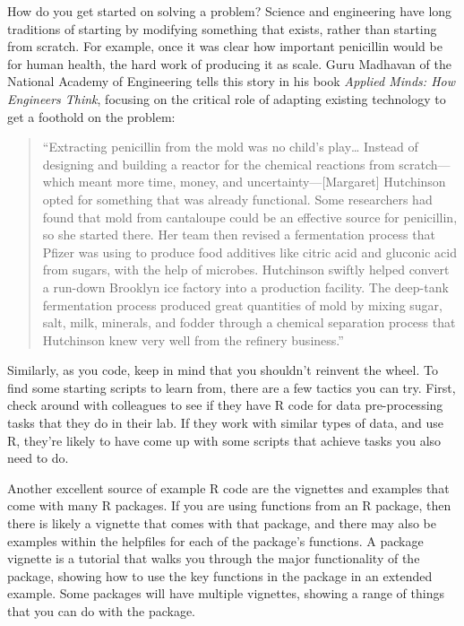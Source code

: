 \documentclass[]{tufte-book}
\begin{document}
How do you get started on solving a problem? Science and engineering have long
traditions of starting by modifying something that exists, rather than starting
from scratch. For example, once it was clear how important penicillin would be
for human health, the hard work of producing it as scale. Guru Madhavan of the
National Academy of Engineering tells this story in his book \emph{Applied Minds: How
Engineers Think}, focusing on the critical role of adapting existing technology
to get a foothold on the problem:

\begin{quote}
``Extracting penicillin from the mold was no child's play\ldots{} Instead of
designing and building a reactor for the chemical reactions from scratch---which
meant more time, money, and uncertainty---{[}Margaret{]} Hutchinson opted for
something that was already functional. Some researchers had found that mold from
cantaloupe could be an effective source for penicillin, so she started there.
Her team then revised a fermentation process that Pfizer was using to produce
food additives like citric acid and gluconic acid from sugars, with the help of
microbes. Hutchinson swiftly helped convert a run-down Brooklyn ice factory into
a production facility. The deep-tank fermentation process produced great
quantities of mold by mixing sugar, salt, milk, minerals, and fodder through a
chemical separation process that Hutchinson knew very well from the refinery
business.'' \citep{madhavan2015applied}
\end{quote}

Similarly, as you code, keep in mind that you shouldn't reinvent the wheel. To
find some starting scripts to learn from, there are a few tactics you can try.
First, check around with colleagues to see if they have R code for data
pre-processing tasks that they do in their lab. If they work with similar types
of data, and use R, they're likely to have come up with some scripts that
achieve tasks you also need to do.

Another excellent source of example R code are the vignettes and examples that
come with many R packages. If you are using functions from an R package, then
there is likely a vignette that comes with that package, and there may also be
examples within the helpfiles for each of the package's functions. A package
vignette is a tutorial that walks you through the major functionality of the
package, showing how to use the key functions in the package in an extended
example. Some packages will have multiple vignettes, showing a range of things
that you can do with the package.
\end{document}
